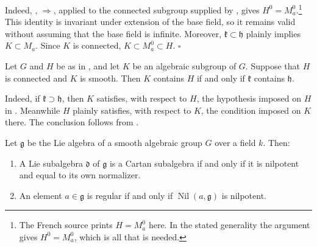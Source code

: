 Indeed, , \(\Rightarrow\), applied to the
connected subgroup supplied by , gives
\(H^0=M_a^0\).\footnote{The French source prints \(H=M_a^0\) here. In the stated
generality the argument gives \(H^0=M_a^0\), which is all that is
needed.}
This identity is invariant under extension of the base field, so it
remains valid without assuming that the base field is infinite.
Moreover, \(\mathfrak k\subset\mathfrak h\) plainly implies
\(K\subset M_a\). Since \(K\) is connected,
\(K\subset M_a^0\subset H\). \hfill\(\square\)

\begin{corollary}
Let \(G\) and \(H\) be as in , and let \(K\) be an
algebraic subgroup of \(G\). Suppose that \(H\) is connected and \(K\)
is smooth. Then \(K\) contains \(H\) if and only if
\(\mathfrak k\) contains \(\mathfrak h\).
\end{corollary}

Indeed, if \(\mathfrak k\supset\mathfrak h\), then \(K\) satisfies,
with respect to \(H\), the hypothesis imposed on \(H\) in
. Meanwhile \(H\) plainly satisfies, with respect to
\(K\), the condition imposed on \(K\) there. The conclusion follows
from .

\begin{corollary}
Let \(\mathfrak g\) be the Lie algebra of a smooth algebraic group
\(G\) over a field \(k\). Then:
\begin{enumerate}
  \item[a)]
  A Lie subalgebra \(\mathfrak d\) of \(\mathfrak g\) is a Cartan
  subalgebra if and only if it is nilpotent and equal to its own
  normalizer.

  \item[b)]
  An element \(a\in\mathfrak g\) is regular if and only if
  \(\operatorname{Nil}(a,\mathfrak g)\) is nilpotent.
\end{enumerate}
\end{corollary}

